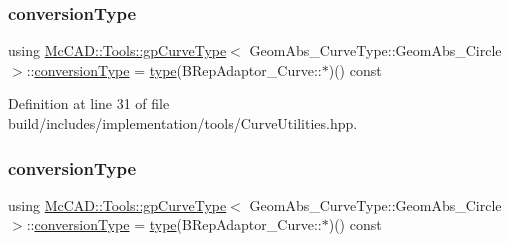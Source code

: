 \subsubsection{\texorpdfstring{conversion\+Type}{conversionType}\hspace{0.1cm}{\footnotesize\ttfamily [1/2]}}
{\footnotesize\ttfamily using \hyperlink{structMcCAD_1_1Tools_1_1gpCurveType}{Mc\+C\+A\+D\+::\+Tools\+::gp\+Curve\+Type}$<$ Geom\+Abs\+\_\+\+Curve\+Type\+::\+Geom\+Abs\+\_\+\+Circle $>$\+::\hyperlink{structMcCAD_1_1Tools_1_1gpCurveType_3_01GeomAbs__CurveType_1_1GeomAbs__Circle_01_4_abd4d90aadd68dfb0068c25797413063d}{conversion\+Type} =  \hyperlink{structMcCAD_1_1Tools_1_1gpCurveType_3_01GeomAbs__CurveType_1_1GeomAbs__Circle_01_4_a689453a3ee8373b37e8d9e6d187827a9}{type}(B\+Rep\+Adaptor\+\_\+\+Curve\+::$\ast$)() const}



Definition at line 31 of file build/includes/implementation/tools/\+Curve\+Utilities.\+hpp.

\mbox{\label{structMcCAD_1_1Tools_1_1gpCurveType_3_01GeomAbs__CurveType_1_1GeomAbs__Circle_01_4_abd4d90aadd68dfb0068c25797413063d}} 
\subsubsection{\texorpdfstring{conversion\+Type}{conversionType}\hspace{0.1cm}{\footnotesize\ttfamily [2/2]}}
{\footnotesize\ttfamily using \hyperlink{structMcCAD_1_1Tools_1_1gpCurveType}{Mc\+C\+A\+D\+::\+Tools\+::gp\+Curve\+Type}$<$ Geom\+Abs\+\_\+\+Curve\+Type\+::\+Geom\+Abs\+\_\+\+Circle $>$\+::\hyperlink{structMcCAD_1_1Tools_1_1gpCurveType_3_01GeomAbs__CurveType_1_1GeomAbs__Circle_01_4_abd4d90aadd68dfb0068c25797413063d}{conversion\+Type} =  \hyperlink{structMcCAD_1_1Tools_1_1gpCurveType_3_01GeomAbs__CurveType_1_1GeomAbs__Circle_01_4_a689453a3ee8373b37e8d9e6d187827a9}{type}(B\+Rep\+Adaptor\+\_\+\+Curve\+::$\ast$)() const}



